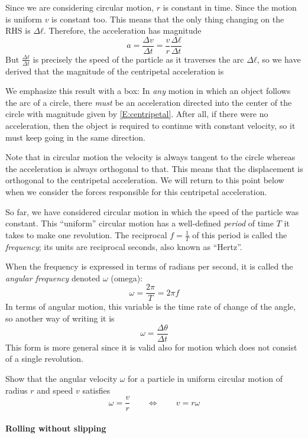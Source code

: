 Since we are considering circular motion, $r$ is constant in time. Since the motion is uniform $v$ is constant too. This means that the only thing changing on the RHS is $Δℓ$. Therefore, the acceleration has magnitude
$$
a = \frac{Δv}{Δt} = \frac vr \frac{Δℓ}{Δt}
$$
But $\frac{Δℓ}{Δt}$ is precisely the speed of the particle as it traverses the arc $Δℓ$, so we have derived that the magnitude of the centripetal acceleration is 

We emphasize this result with a box: In {\em any} motion in which an object follows the arc of a circle, there {\em must} be an acceleration directed into the center of the circle with magnitude given by \eqref{E:centripetal}. After all, if there were no acceleration, then the object is required to continue with constant velocity, so it must keep going in the same direction. 

Note that in circular motion the velocity is always tangent to the circle whereas the acceleration is always orthogonal to that. This means that the displacement is orthogonal to the centripetal acceleration. We will return to this point below when we consider the forces responsible for this centripetal acceleration. 

So far, we have considered circular motion in which the speed of the particle was constant. This “uniform” circular motion has a well-defined {\em period} of time $T$ it takes to make one revolution. The reciprocal $f=\frac1T$ of this period is called the {\em frequency}; its units are reciprocal seconds, also known as “Hertz”. 

When the frequency is expressed in terms of radians per second, it is called the {\em angular frequency} denoted $ω$ (omega):
$$
ω = \frac {2π}T = 2π f
$$
In terms of angular motion, this variable is the time rate of change of the angle, so another way of writing it is 
$$
ω = \frac{Δθ}{Δt}
$$
This form is more general since it is valid also for motion which does not consist of a single revolution. 

\begin{exercise}
Show that the angular velocity $ω$ for a particle in uniform circular motion of radius $r$ and speed $v$ satisfies
$$
ω = \frac vr
\quad \quad ⇔  \quad \quad
\boxed{v=r ω }
$$
\end{exercise} 

\paragraph{Rolling without slipping}

